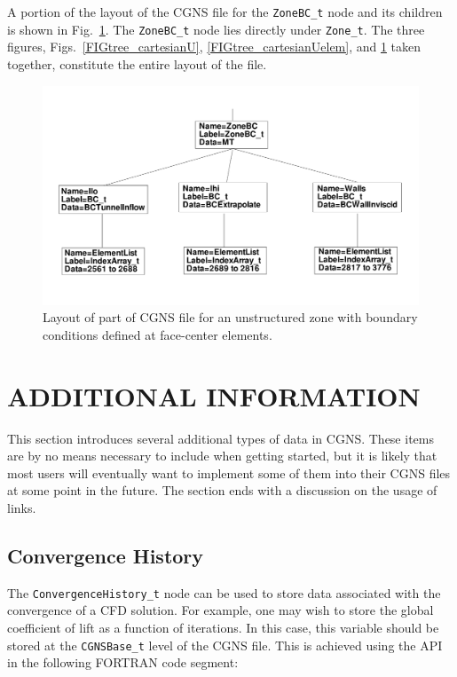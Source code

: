 \documentclass[12pt]{article}
\begin{document}
A portion of the layout of the CGNS file for the {\tt ZoneBC\_t}
node and its children is shown in Fig.~\ref{FIGtree_cartesian_UBC}.  The {\tt ZoneBC\_t}
node lies directly under {\tt Zone\_t}.  The three figures,
Figs.~\ref{FIGtree_cartesianU}, \ref{FIGtree_cartesianUelem}, and
\ref{FIGtree_cartesian_UBC} taken together, constitute the entire layout of
the file.

\begin{figure}[hpbt]
\centerline{{\includegraphics[width=150mm]{figures/tree_cartesian_UBC}}}
\caption{Layout of part of CGNS file for an unstructured zone with
boundary conditions defined at face-center elements.}
\label{FIGtree_cartesian_UBC}
\end{figure}
%

\newpage
\section{ADDITIONAL INFORMATION} \label{sec:advanced}

This section introduces several additional types of data in CGNS.
These items are by no means necessary to include when getting
started, but it is likely that most users will eventually want
to implement some of them into their CGNS files at some point in the future.
The section ends with a discussion on the usage of links.

\subsection{Convergence History} \label{sec:converge}

The {\tt ConvergenceHistory\_t} node can be used to store
data associated with the convergence of a CFD solution. 
For example, one may wish to store the global coefficient of lift
as a function of iterations.  In this case, 
this variable should be stored at the {\tt CGNSBase\_t} level
of the CGNS file.
This is achieved using the API in the following FORTRAN code 
segment:
\end{document}
